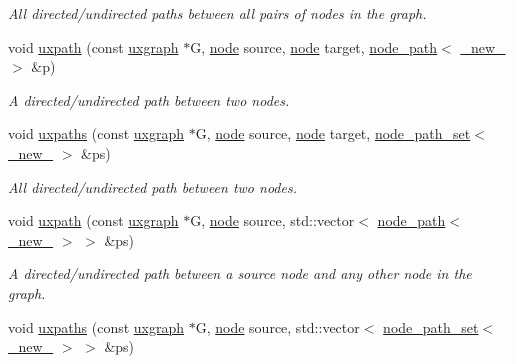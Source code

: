 \begin{DoxyCompactItemize}
\begin{DoxyCompactList}\small\item\em All directed/undirected paths between all pairs of nodes in the graph. \end{DoxyCompactList}\item 
void \hyperlink{namespacelgraph_1_1traversal_a143fd991f5e035c64c94b2ac8d84b08c}{uxpath} (const \hyperlink{classlgraph_1_1uxgraph}{uxgraph} $\ast$G, \hyperlink{namespacelgraph_a397169dd66adf725210a30fb7251773e}{node} source, \hyperlink{namespacelgraph_a397169dd66adf725210a30fb7251773e}{node} target, \hyperlink{classlgraph_1_1node__path}{node\+\_\+path}$<$ \hyperlink{namespacelgraph_a2836f966c1c36b43da337d8907728ec0}{\+\_\+new\+\_\+} $>$ \&p)
\begin{DoxyCompactList}\small\item\em A directed/undirected path between two nodes. \end{DoxyCompactList}\item 
void \hyperlink{namespacelgraph_1_1traversal_a16078c9a8e08e18e017590e6e13860ec}{uxpaths} (const \hyperlink{classlgraph_1_1uxgraph}{uxgraph} $\ast$G, \hyperlink{namespacelgraph_a397169dd66adf725210a30fb7251773e}{node} source, \hyperlink{namespacelgraph_a397169dd66adf725210a30fb7251773e}{node} target, \hyperlink{namespacelgraph_a0570ce57129123d5816913d287f6cc73}{node\+\_\+path\+\_\+set}$<$ \hyperlink{namespacelgraph_a2836f966c1c36b43da337d8907728ec0}{\+\_\+new\+\_\+} $>$ \&ps)
\begin{DoxyCompactList}\small\item\em All directed/undirected path between two nodes. \end{DoxyCompactList}\item 
void \hyperlink{namespacelgraph_1_1traversal_a820cbf2f4ae33b2d358b3636679709fb}{uxpath} (const \hyperlink{classlgraph_1_1uxgraph}{uxgraph} $\ast$G, \hyperlink{namespacelgraph_a397169dd66adf725210a30fb7251773e}{node} source, std\+::vector$<$ \hyperlink{classlgraph_1_1node__path}{node\+\_\+path}$<$ \hyperlink{namespacelgraph_a2836f966c1c36b43da337d8907728ec0}{\+\_\+new\+\_\+} $>$ $>$ \&ps)
\begin{DoxyCompactList}\small\item\em A directed/undirected path between a source node and any other node in the graph. \end{DoxyCompactList}\item 
void \hyperlink{namespacelgraph_1_1traversal_a1dae339c9382f50b0ebaea7d52c87aee}{uxpaths} (const \hyperlink{classlgraph_1_1uxgraph}{uxgraph} $\ast$G, \hyperlink{namespacelgraph_a397169dd66adf725210a30fb7251773e}{node} source, std\+::vector$<$ \hyperlink{namespacelgraph_a0570ce57129123d5816913d287f6cc73}{node\+\_\+path\+\_\+set}$<$ \hyperlink{namespacelgraph_a2836f966c1c36b43da337d8907728ec0}{\+\_\+new\+\_\+} $>$ $>$ \&ps)

\end{DoxyCompactItemize}

